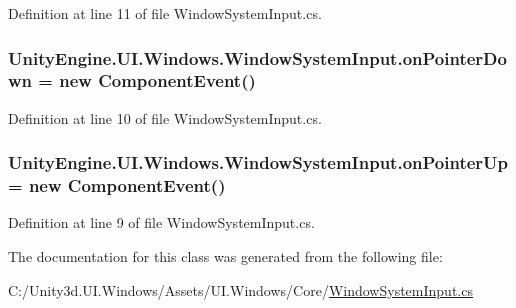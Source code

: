 Definition at line 11 of file Window\+System\+Input.\+cs.

\hypertarget{class_unity_engine_1_1_u_i_1_1_windows_1_1_window_system_input_aa03e666552b8067e984960fe956fec02}{}
\subsubsection[{on\+Pointer\+Down}]{ Unity\+Engine.\+U\+I.\+Windows.\+Window\+System\+Input.\+on\+Pointer\+Down = new {\bf Component\+Event}()\hspace{0.3cm}{\ttfamily [static]}}\label{class_unity_engine_1_1_u_i_1_1_windows_1_1_window_system_input_aa03e666552b8067e984960fe956fec02}


Definition at line 10 of file Window\+System\+Input.\+cs.

\hypertarget{class_unity_engine_1_1_u_i_1_1_windows_1_1_window_system_input_a580cd0bea2bd1db8ffff06a9013d2f77}{}
\subsubsection[{on\+Pointer\+Up}]{ Unity\+Engine.\+U\+I.\+Windows.\+Window\+System\+Input.\+on\+Pointer\+Up = new {\bf Component\+Event}()\hspace{0.3cm}{\ttfamily [static]}}\label{class_unity_engine_1_1_u_i_1_1_windows_1_1_window_system_input_a580cd0bea2bd1db8ffff06a9013d2f77}


Definition at line 9 of file Window\+System\+Input.\+cs.



The documentation for this class was generated from the following file\+:\begin{DoxyCompactItemize}
\item 
C\+:/\+Unity3d.\+U\+I.\+Windows/\+Assets/\+U\+I.\+Windows/\+Core/\hyperlink{_window_system_input_8cs}{Window\+System\+Input.\+cs}\end{DoxyCompactItemize}
